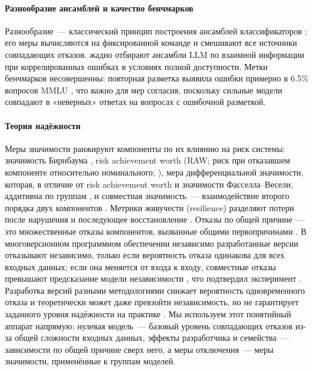 \documentclass[preprint,12pt,authoryear]{elsarticle}
\begin{document}
\paragraph{Разнообразие ансамблей и качество бенчмарков} Разнообразие~--- классический принцип построения ансамблей классификаторов \citep{kuncheva2003,brown2005}; его меры вычисляются на фиксированной команде и смешивают все источники совпадающих отказов. \citet{turkmen2026} жадно отбирают ансамбли LLM по взаимной информации при коррелированных ошибках в условиях полной доступности. Метки бенчмарков несовершенны: повторная разметка выявила ошибки примерно в 6.5\% вопросов MMLU \citep{gema2025mmlu}, что важно для мер согласия, поскольку сильные модели совпадают в «неверных» ответах на вопросах с ошибочной разметкой.

\paragraph{Теория надёжности} Меры значимости ранжируют компоненты по их влиянию на риск системы: значимость Бирнбаума \citep{birnbaum1969}, risk achievement worth (RAW; риск при отказавшем компоненте относительно номинального; \citealp{vesely1983}), мера дифференциальной значимости, которая, в отличие от risk achievement worth и значимости Фасселла--Весели, аддитивна по группам \citep{borgonovo2001}, и совместная значимость~--- взаимодействие второго порядка двух компонентов \citep{honglie1993}. Метрики живучести (resilience) разделяют потери после нарушения и последующее восстановление \citep{henry2012,hosseini2016}. Отказы по общей причине~--- это множественные отказы компонентов, вызванные общими первопричинами \citep{iaea1992ccf}. В многоверсионном программном обеспечении независимо разработанные версии отказывают независимо, только если вероятность отказа одинакова для всех входных данных; если она меняется от входа к входу, совместные отказы превышают предсказание модели независимости \citep{eckhardt1985}, что подтвердил эксперимент \citep{knight1986}. Разработка версий разными методологиями снижает вероятность одновременного отказа и теоретически может даже превзойти независимость, но не гарантирует заданного уровня надёжности на практике \citep{littlewood1989}. Мы используем этот понятийный аппарат напрямую: нулевая модель~--- базовый уровень совпадающих отказов из-за общей сложности входных данных, эффекты разработчика и семейства~--- зависимости по общей причине сверх него, а меры отключения~--- меры значимости, применённые к группам моделей.
\end{document}
